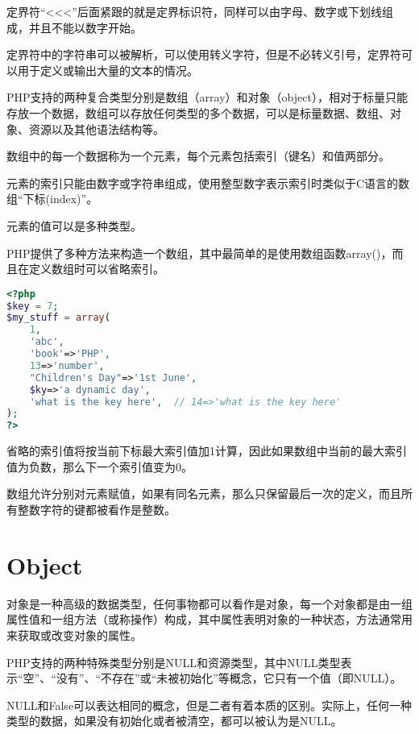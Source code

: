 定界符“<\/<\/<”后面紧跟的就是定界标识符，同样可以由字母、数字或下划线组成，并且不能以数字开始。

定界符中的字符串可以被解析，可以使用转义字符，但是不必转义引号，定界符可以用于定义或输出大量的文本的情况。

PHP支持的两种复合类型分别是数组（array）和对象（object），相对于标量只能存放一个数据，数组可以存放任何类型的多个数据，可以是标量数据、数组、对象、资源以及其他语法结构等。



\begin{compactitem}
\item 数组中的每一个数据称为一个元素，每个元素包括索引（键名）和值两部分。
\item 元素的索引只能由数字或字符串组成，使用整型数字表示索引时类似于C语言的数组“下标(index)”。
\item 元素的值可以是多种类型。
\end{compactitem}

PHP提供了多种方法来构造一个数组，其中最简单的是使用数组函数array()，而且在定义数组时可以省略索引。

\begin{lstlisting}[language=PHP]
<?php
$key = 7;
$my_stuff = array(
	1,
	'abc',
	'book'=>'PHP',
	13=>'number',
	"Children's Day"=>'1st June',
	$ky=>'a dynamic day',
	'what is the key here',  // 14=>'what is the key here'
);
?>
\end{lstlisting}

省略的索引值将按当前下标最大索引值加1计算，因此如果数组中当前的最大索引值为负数，那么下一个索引值变为0。

数组允许分别对元素赋值，如果有同名元素，那么只保留最后一次的定义，而且所有整数字符的键都被看作是整数。

\section{Object}


对象是一种高级的数据类型，任何事物都可以看作是对象，每一个对象都是由一组属性值和一组方法（或称操作）构成，其中属性表明对象的一种状态，方法通常用来获取或改变对象的属性。




PHP支持的两种特殊类型分别是NULL和资源类型，其中NULL类型表示“空”、“没有”、“不存在”或“未被初始化”等概念，它只有一个值（即NULL）。

NULL和False可以表达相同的概念，但是二者有着本质的区别。实际上，任何一种类型的数据，如果没有初始化或者被清空，都可以被认为是NULL。

